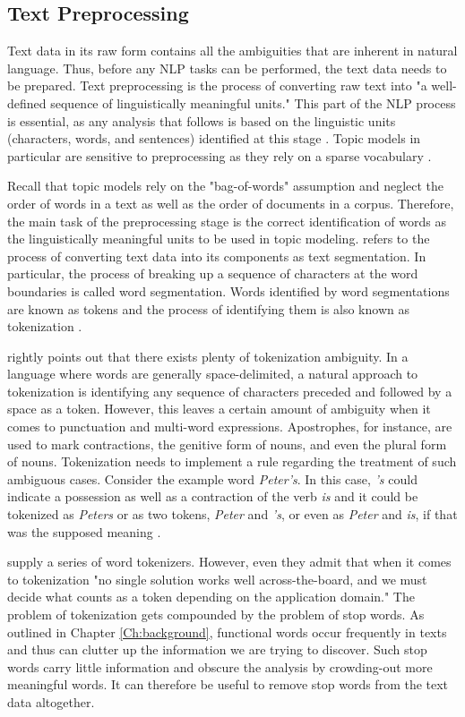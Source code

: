 \documentclass[11pt,a4paper,english,oneside]{book}
\numberwithin{equation}{chapter}
\begin{document}
\subsection{Text Preprocessing}\label{preprocessing}
Text data in its raw form contains all the ambiguities that are inherent in natural language. Thus, before any NLP tasks can be performed, the text data needs to be prepared. Text preprocessing is the process of converting raw text into "a well-defined sequence of linguistically meaningful units." This part of the NLP process is essential, as any analysis that follows is based on the linguistic units (characters, words, and sentences) identified at this stage \cite[p. 9]{Palmer.2010}. Topic models in particular are sensitive to preprocessing as they rely on a sparse vocabulary \cite[p. 288]{Schofield.2016}.

Recall that topic models rely on the "bag-of-words" assumption and neglect the order of words in a text as well as the order of documents in a corpus. Therefore, the main task of the preprocessing stage is the correct identification of words as the linguistically meaningful units to be used in topic modeling. \citet[p. 10]{Palmer.2010} refers to the process of converting text data into its components as text segmentation. In particular, the process of breaking up a sequence of characters at the word boundaries is called word segmentation. Words identified by word segmentations are known as tokens and the process of identifying them is also known as tokenization \citep[p. 10]{Palmer.2010}.

\citet[pp. 16-19]{Palmer.2010} rightly points out that there exists plenty of tokenization ambiguity. In a language where words are generally space-delimited, a natural approach to tokenization is identifying any sequence of characters preceded and followed by a space as a token. However, this leaves a certain amount of ambiguity when it comes to punctuation and multi-word expressions. Apostrophes, for instance, are used to mark contractions, the genitive form of nouns, and even the plural form of nouns. Tokenization needs to implement a rule regarding the treatment of such ambiguous cases. Consider the example word \textit{Peter's}. In this case, \textit{'s} could indicate a possession as well as a contraction of the verb \textit{is} and it could be tokenized as \textit{Peters} or as two tokens, \textit{Peter} and \textit{'s}, or even as \textit{Peter} and \textit{is}, if that was the supposed meaning \cite[pp. 16-19]{Palmer.2010}.

\cite{Bird.2010} supply a series of word tokenizers. However, even they admit that when it comes to tokenization "no single solution works well across-the-board, and we must decide what counts as a token depending on the application domain." The problem of tokenization gets compounded by the problem of stop words. As outlined in Chapter \ref{Ch:background}, functional words occur frequently in texts and thus can clutter up the information we are trying to discover. Such stop words carry little information and obscure the analysis by crowding-out more meaningful words. It can therefore be useful to remove stop words from the text data altogether. 
\end{document}
